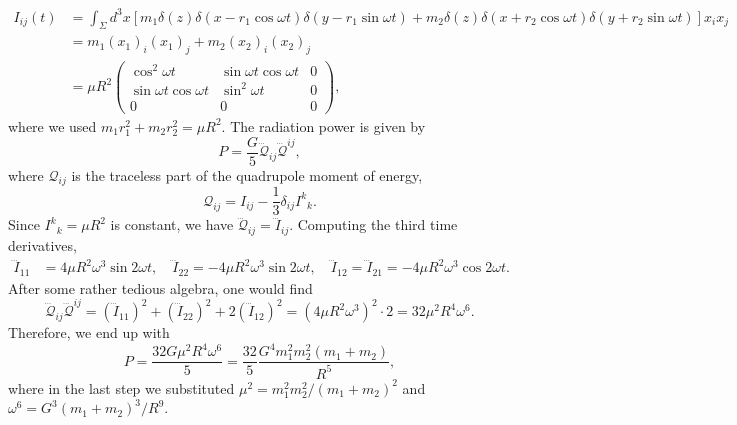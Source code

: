 \begin{enumerate}[label=\roman*)]
\begin{solution}
\begin{equation}
\begin{aligned}
                I_{ij}(t) &= \int_\Sigma d^3x\left[ m_1\delta(z) \delta(x-r_1\cos\omega t)\delta(y-r_1\sin \omega t) + m_2\delta(z) \delta(x+r_2\cos\omega t)\delta(y+r_2\sin\omega t)\right]x_i x_j\\
                &= m_1(x_1)_i(x_1)_j + m_2(x_2)_i(x_2)_j\\
                &=\mu R^2\begin{pmatrix}
                    \cos^2\omega t & \sin\omega t\cos\omega t & 0\\
                    \sin\omega t\cos\omega t & \sin^2\omega t & 0\\
                    0 & 0 & 0
                \end{pmatrix},
            \end{aligned}   
        \end{equation}
        where we used $m_1r_1^2 + m_2r_2^2 = \mu R^2$. The radiation power is given by 
        \begin{equation}
            P = \frac{G}{5} \dddot{\mathcal{Q}}_{ij}\dddot{\mathcal{Q}}^{ij},
        \end{equation}
        where $\mathcal{Q}_{ij}$ is the traceless part of the quadrupole moment of energy,
        \begin{equation}
            \mathcal{Q}_{ij} =  I_{ij} - \frac{1}{3}\delta_{ij}I^k{}_k. 
        \end{equation}
        Since $I^k{}_k = \mu R^2$ is constant, we have $\dddot{\mathcal{Q}}_{ij} = \dddot{I}_{ij}$. Computing the third time derivatives,
        \begin{align}
            \dddot{I}_{11} &= 4\mu R^2\omega^3\sin 2\omega t, \quad
            \dddot{I}_{22} = -4\mu R^2\omega^3\sin 2\omega t, \quad
            \dddot{I}_{12} = \dddot{I}_{21} = -4\mu R^2\omega^3\cos 2\omega t.
        \end{align}
        After some rather tedious algebra, one would find
        \begin{equation}
            \dddot{\mathcal{Q}}_{ij}\dddot{\mathcal{Q}}^{ij} = (\dddot{I}_{11})^2 + (\dddot{I}_{22})^2 + 2(\dddot{I}_{12})^2 = (4\mu R^2\omega^3)^2\cdot 2 = 32\mu^2R^4\omega^6.
        \end{equation}
        Therefore, we end up with
        \begin{equation}
            P = \frac{32G\mu^2 R^4\omega^6}{5} = \frac{32}{5}\frac{G^4m_1^2m_2^2(m_1+m_2)}{R^5},
        \end{equation}
        where in the last step we substituted $\mu^2 = m_1^2m_2^2/(m_1+m_2)^2$ and $\omega^6 = G^3(m_1+m_2)^3/R^9$.

\end{solution}
\end{enumerate}
